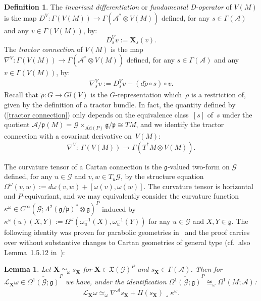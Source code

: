 \documentclass[11pt]{article}
\def\k{\kappa}
\def\g{\mathfrak{g}}
\def\p{\mathfrak{p}}
\def\Abdle{\mathcal{A}}
\def\Gbdle{\mathcal{G}}
\def\VF{\mathfrak{X}}
\def\:{\lrcorner}
\def\tens{\otimes}
\def\isom{\cong}
\theoremstyle{plain}
\newtheorem{Lemma}[Theorem]{Lemma}
\theoremstyle{definition}
\newtheorem{Definition}{Definition}[section]
\begin{document}
\begin{Definition} \label{differentiation} The \textit{invariant differentiation} or \textit{fundamental D-operator} of $V(M)$ is the map $D^{V} : \Gamma(V(M)) \rightarrow \Gamma(\Abdle^* \tens V(M))$ def\/ined, for any $s \in \Gamma(\Abdle)$ and any $v \in \Gamma(V(M))$, by:
\[
D_s^{V}v := \mathbf{X}_s(v).
\]
The \textit{tractor connection} of $V(M)$ is the map $\nabla^{V}: \Gamma(V(M)) \rightarrow \Gamma(\Abdle^* \tens V(M))$ def\/ined, for any $s \in \Gamma(\Abdle)$ and any $v \in \Gamma(V(M))$, by:
\begin{gather}
\nabla^{V}_s v := D^{V}_s v + (d\tilde{\rho} \circ s) \circ v. \label{tractor connection}
\end{gather}
 Recall that $\tilde{\rho}: G \rightarrow Gl(V)$ is the $G$-representation which~$\rho$ is a restriction of, given by the def\/inition of a tractor bundle. In fact, the quantity def\/ined by (\ref{tractor connection}) only depends on the equiva\-len\-ce class~$[s]$ of~$s$ under the quotient $\Abdle/\p(M) = \Gbdle \times_{\overline{\mathrm{Ad}}(P)} \g/\p \isom TM$, and we identify the tractor connection with a covariant derivative on~$V(M)$:
\[
\nabla^V: \ \Gamma(V(M)) \rightarrow \Gamma(T^*M \tens V(M)).
\]
\end{Definition}

The curvature tensor of a Cartan connection is the $\g$-valued two-form on $\Gbdle$ def\/ined, for any $u \in \Gbdle$ and $v, w \in T_u\Gbdle$, by the structure equation $\Omega^{\omega}(v,w) := d\omega(v,w) + [\omega(v),\omega(w)]$. The curvature tensor is horizontal and $P$-equivariant, and we may equivalently consider the curvature function $\kappa^{\omega} \in C^{\infty}(\Gbdle;\Lambda^2(\g/\p)^* \tens \g)^P$ induced by $\kappa^{\omega}(u)(X,Y) := \Omega^{\omega}(\omega_u^{-1}(X),\omega_u^{-1}(Y))$ for any $u \in \Gbdle$ and $X,Y \in \g$. The following identity was proven for parabolic geometries in~\cite{Cap inf aut} and the proof carries over without substantive changes to Cartan geometries of general type (cf.\ also Lemma~1.5.12 in~\cite{CSbook}):

\begin{Lemma} \label{infinitesimal deformation} Let $\mathbf{X} \simeq_{\omega} s_{\mathbf{X}}$ for $\mathbf{X} \in \VF(\Gbdle)^P$ and $s_{\mathbf{X}} \in \Gamma(\Abdle)$. Then for $\mathcal{L}_{\mathbf{X}} \omega \in \overline{\Omega^1(\Gbdle;\g)}^P$ we have, under the identification $\overline{\Omega^1(\Gbdle;\g)}^P \isom_{\omega} \Omega^1(M;\Abdle)$:
\begin{gather}
\mathcal{L}_{\mathbf{X}} \omega \simeq_{\omega} \nabla^{\Abdle} s_{\mathbf{X}} + \Pi(s_{\mathbf{X}}) \: \k^{\omega}. \label{infinitesimal deformation identity}
\end{gather}
\end{Lemma}
\end{document}
